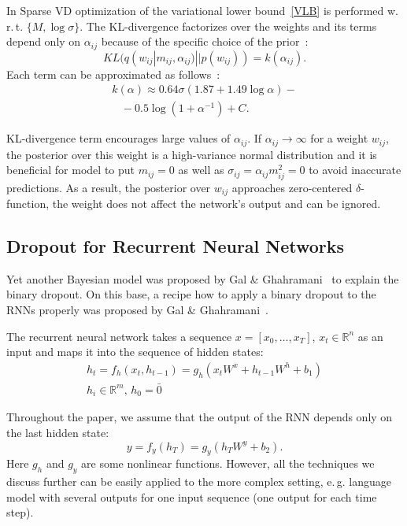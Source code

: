 \documentclass{article}
\begin{document}
In Sparse VD optimization of the variational lower bound~\eqref{VLB} is performed w.\,r.\,t. $\{M, \log \sigma\}$. The KL-divergence factorizes over the weights and its terms depend only on $\alpha_{ij}$ because of the specific choice of the prior~\cite{kingma}:
\begin{equation}
KL(q(w_{ij}|m_{ij}, \alpha_{ij})||p(w_{ij}))=k(\alpha_{ij}).
\end{equation}
Each term can be approximated as follows~\cite{dmolch}:
\begin{equation}
\begin{gathered}
k(\alpha) \approx 0.64 \sigma (1.87 + 1.49\log \alpha)-\\
\:\:\:\,- 0.5 \log(1 + \alpha^{-1}) + C.
\label{kl}
\end{gathered}
\end{equation}

KL-divergence term encourages large values of $\alpha_{ij}$. If $\alpha_{ij} \rightarrow \infty$ for a weight $w_{ij}$, the posterior over this weight is a high-variance normal distribution and it is beneficial for model to put   $m_{ij} = 0$ as well as $\sigma_{ij}=\alpha_{ij} m^2_{ij}=0$ to avoid inaccurate predictions. As a result, the posterior over $w_{ij}$ approaches zero-centered $\delta$-function, the weight does not affect the network's output and can be ignored. 

\subsection{Dropout for Recurrent Neural Networks}
Yet another Bayesian model was proposed by Gal \& Ghahramani~ to explain the binary dropout. On this base, a recipe how to apply a binary dropout to the RNNs properly was proposed by Gal \& Ghahramani~.

The recurrent neural network takes a sequence $x = [x_0, \dots, x_T]$, $x_t\in \mathbb{R}^n$ as an input and maps it into the sequence of hidden states:
\begin{equation}
\begin{gathered}
h_{t} = f_h(x_t, h_{t-1}) = g_h(x_{t} W^x  + h_{t-1} W^h  + b_1)\\
h_i \in \mathbb{R}^m, \, h_0 = \bar 0
\end{gathered}
\end{equation}

Throughout the paper, we assume that the output of the RNN depends only on the last hidden state:
\begin{equation}
y = f_y(h_T) = g_y(h_T W^y + b_2).
\end{equation}
Here $g_h$ and $g_y$ are some nonlinear functions.
However, all the techniques we discuss further can be easily applied to the more complex setting, e.\,g. language model with several outputs for one input sequence (one output for each time step).
\end{document}
